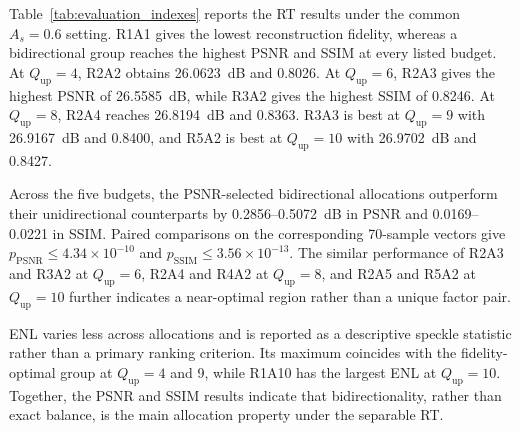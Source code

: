 \documentclass[conference]{IEEEtran}
\begin{document}
Table~\ref{tab:evaluation_indexes} reports the RT results under the common $A_s=0.6$ setting. R1A1 gives the lowest reconstruction fidelity, whereas a bidirectional group reaches the highest PSNR and SSIM at every listed budget. At $Q_{\mathrm{up}}=4$, R2A2 obtains 26.0623~dB and 0.8026. At $Q_{\mathrm{up}}=6$, R2A3 gives the highest PSNR of 26.5585~dB, while R3A2 gives the highest SSIM of 0.8246. At $Q_{\mathrm{up}}=8$, R2A4 reaches 26.8194~dB and 0.8363. R3A3 is best at $Q_{\mathrm{up}}=9$ with 26.9167~dB and 0.8400, and R5A2 is best at $Q_{\mathrm{up}}=10$ with 26.9702~dB and 0.8427.

Across the five budgets, the PSNR-selected bidirectional allocations outperform their unidirectional counterparts by 0.2856--0.5072~dB in PSNR and 0.0169--0.0221 in SSIM. Paired comparisons on the corresponding 70-sample vectors give $p_{\mathrm{PSNR}}\leq4.34\times10^{-10}$ and $p_{\mathrm{SSIM}}\leq3.56\times10^{-13}$. The similar performance of R2A3 and R3A2 at $Q_{\mathrm{up}}=6$, R2A4 and R4A2 at $Q_{\mathrm{up}}=8$, and R2A5 and R5A2 at $Q_{\mathrm{up}}=10$ further indicates a near-optimal region rather than a unique factor pair.

ENL varies less across allocations and is reported as a descriptive speckle statistic rather than a primary ranking criterion. Its maximum coincides with the fidelity-optimal group at $Q_{\mathrm{up}}=4$ and 9, while R1A10 has the largest ENL at $Q_{\mathrm{up}}=10$. Together, the PSNR and SSIM results indicate that bidirectionality, rather than exact balance, is the main allocation property under the separable RT.
\end{document}

